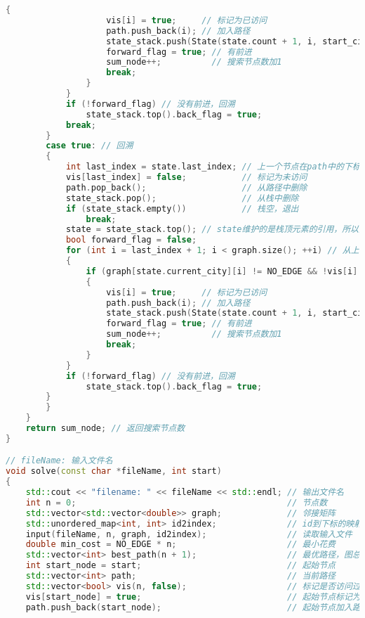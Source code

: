 \documentclass[lang=cn,11pt,a4paper]{elegantpaper}
\begin{document}
\begin{lstlisting}[language=c++]
                {
                    vis[i] = true;     // 标记为已访问
                    path.push_back(i); // 加入路径
                    state_stack.push(State(state.count + 1, i, start_city, state.now_cost + graph[state.current_city][i], i, false));
                    forward_flag = true; // 有前进
                    sum_node++;          // 搜索节点数加1
                    break;
                }
            }
            if (!forward_flag) // 没有前进，回溯
                state_stack.top().back_flag = true;
            break;
        }
        case true: // 回溯
        {
            int last_index = state.last_index; // 上一个节点在path中的下标
            vis[last_index] = false;           // 标记为未访问
            path.pop_back();                   // 从路径中删除
            state_stack.pop();                 // 从栈中删除
            if (state_stack.empty())           // 栈空，退出
                break;
            state = state_stack.top(); // state维护的是栈顶元素的引用，所以要更新state
            bool forward_flag = false;
            for (int i = last_index + 1; i < graph.size(); ++i) // 从上一个节点的下一个节点开始找
            {
                if (graph[state.current_city][i] != NO_EDGE && !vis[i] && graph[state.current_city][i] + state.now_cost < min_cost)
                {
                    vis[i] = true;     // 标记为已访问
                    path.push_back(i); // 加入路径
                    state_stack.push(State(state.count + 1, i, start_city, state.now_cost + graph[state.current_city][i], i, false));
                    forward_flag = true; // 有前进
                    sum_node++;          // 搜索节点数加1
                    break;
                }
            }
            if (!forward_flag) // 没有前进，回溯
                state_stack.top().back_flag = true;
        }
        }
    }
    return sum_node; // 返回搜索节点数
}

// fileName: 输入文件名
void solve(const char *fileName, int start)
{
    std::cout << "filename: " << fileName << std::endl; // 输出文件名
    int n = 0;                                          // 节点数
    std::vector<std::vector<double>> graph;             // 邻接矩阵
    std::unordered_map<int, int> id2index;              // id到下标的映射
    input(fileName, n, graph, id2index);                // 读取输入文件
    double min_cost = NO_EDGE * n;                      // 最小花费
    std::vector<int> best_path(n + 1);                  // 最优路径，图总共n个点，回到起点又是一个点，所以是n+1个点
    int start_node = start;                             // 起始节点
    std::vector<int> path;                              // 当前路径
    std::vector<bool> vis(n, false);                    // 标记是否访问过
    vis[start_node] = true;                             // 起始节点标记为已访问
    path.push_back(start_node);                         // 起始节点加入路径


\end{lstlisting}
\end{document}
